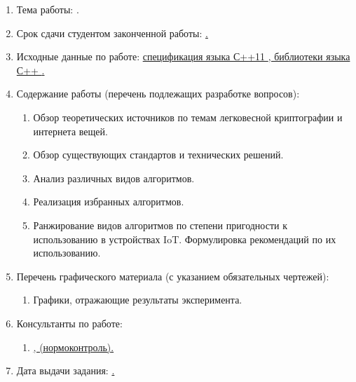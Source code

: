 \begin{enumerate}[1.]
	\item Тема работы: {\expandafter \ulined \thesisTitle.}
	\item Срок сдачи студентом законченной работы: \uline{\thesisDeadline.} 
	\item Исходные данные по работе: \uline{спецификация языка С++11 \cite{task_src1}, библиотеки языка С++ \cite{task_src2}.}%
	\printbibliographyTask %
	\item Содержание работы (перечень подлежащих разработке вопросов):
	\begin{enumerate}[label=\theenumi\arabic*.]
		\item Обзор теоретических источников по темам легковесной криптографии и интернета вещей.
		\item Обзор существующих стандартов и технических решений.
		\item Анализ различных видов алгоритмов.
		\item Реализация избранных алгоритмов.
		\item Ранжирование видов алгоритмов по степени пригодности к использованию в устройствах IoT. Формулировка рекомендаций по их использованию.
	\end{enumerate}
	\item Перечень графического материала (с указанием обязательных чертежей): 
	\begin{enumerate}[label=\theenumi\arabic*.]
		\item Графики, отражающие результаты эксперимента.
	\end{enumerate}	
		\item Консультанты по работе:
		\begin{enumerate}[label=\theenumi\arabic*.] 
		\item \uline{\emakefirstuc{\ConsultantNormDegree}, \ConsultantNorm{} (нормоконтроль).} %
	\end{enumerate}
		\item Дата выдачи задания: \uline{\thesisStartDate.}
\end{enumerate}

